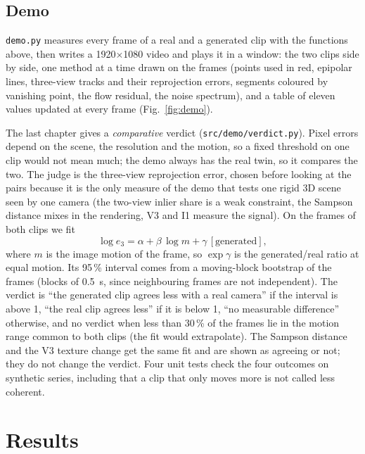 \documentclass[11pt,a4paper]{article}
\begin{document}
\subsection{Demo}

\texttt{demo.py} measures every frame of a real and a generated clip with the functions above,
then writes a 1920$\times$1080 video and plays it in a window: the two clips side by side, one
method at a time drawn on the frames (points used in red, epipolar lines, three-view tracks
and their reprojection errors, segments coloured by vanishing point, the flow residual, the
noise spectrum), and a table of eleven values updated at every frame (Fig.~\ref{fig:demo}).

The last chapter gives a \emph{comparative} verdict (\texttt{src/demo/verdict.py}). Pixel
errors depend on the scene, the resolution and the motion, so a fixed threshold on one clip
would not mean much; the demo always has the real twin, so it compares the two. The judge is
the three-view reprojection error, chosen before looking at the pairs because it is the only
measure of the demo that tests one rigid 3D scene seen by one camera (the two-view inlier share
is a weak constraint, the Sampson distance mixes in the rendering, V3 and I1 measure the
signal). On the frames of both clips we fit
\begin{equation}
  \log e_3 = \alpha + \beta\,\log m + \gamma\,[\text{generated}],
\end{equation}
where $m$ is the image motion of the frame, so $\exp\gamma$ is the generated/real ratio at equal
motion. Its 95\,\% interval comes from a moving-block bootstrap of the frames (blocks of
0.5~s, since neighbouring frames are not independent). The verdict is ``the generated clip
agrees less with a real camera'' if the interval is above 1, ``the real clip agrees less'' if
it is below 1, ``no measurable difference'' otherwise, and no verdict when less than 30\,\% of
the frames lie in the motion range common to both clips (the fit would extrapolate). The
Sampson distance and the V3 texture change get the same fit and are shown as agreeing or not;
they do not change the verdict. Four unit tests check the four outcomes on synthetic series,
including that a clip that only moves more is not called less coherent.

\section{Results}
\end{document}
